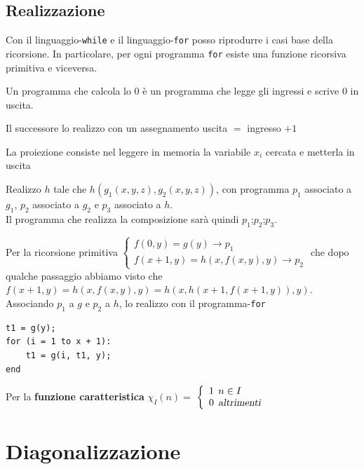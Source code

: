 \documentclass[10pt]{book}
\begin{document}
\subsection{Realizzazione}
Con il linguaggio-\texttt{while} e il linguaggio-\texttt{for} posso riprodurre i casi base della ricorsione. In particolare, per ogni programma \texttt{for} esiste una funzione ricorsiva primitiva e viceversa.\\
\begin{list}{}{}
	\item Un programma che calcola lo $0$ è un programma che legge gli ingressi e scrive $0$ in uscita.
	\item Il successore lo realizzo con un assegnamento uscita $=$ ingresso $ + 1$
	\item La proiezione consiste nel leggere in memoria la variabile $x_i$ cercata e metterla in uscita
	\item Realizzo $h$ tale che $h(g_1(x, y, z), g_2(x, y, z))$, con programma $p_1$ associato a $g_1$, $p_2$ associato a $g_2$ e $p_3$ associato a $h$.\\
Il programma che realizza la composizione sarà quindi $p_1$;$p_2$;$p_3$.\\
	\item Per la ricorsione primitiva
	\begin{math}
		\left\{
		\begin{array}{l}
			f(0, y) = g(y) \rightarrow p_1\\
			f(x + 1, y) = h(x, f(x, y), y) \rightarrow p_2
		\end{array}
		\right.
	\end{math}
	che dopo qualche passaggio abbiamo visto che\\$f(x + 1, y) =  h(x, f(x, y), y) = h(x, h(x + 1, f( x + 1, y)), y)$. Associando $p_1$ a $g$ e $p_2$ a $h$, lo realizzo con il programma-\texttt{for}
	\begin{lstlisting}
t1 = g(y);
for (i = 1 to x + 1):
	t1 = g(i, t1, y);
end
	\end{lstlisting}
\end{list}
Per la \textbf{funzione caratteristica} $\chi_I(n) =$
\begin{math}
		\left\{
		\begin{array}{l}
			1\:\: n \in I\\
			0\:\:\textsl{altrimenti}
		\end{array}
		\right.
\end{math}
\pagebreak
\section{Diagonalizzazione}
\end{document}
